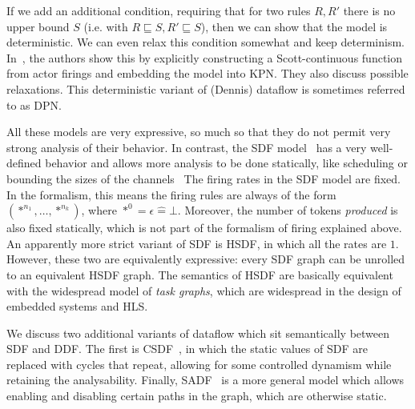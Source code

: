 If we add an additional condition, requiring that for two rules $R,R'$ there is no upper bound $S$ (i.e. with $R \sqsubseteq S, R' \sqsubseteq S$), then we can show that the model is deterministic.
We can even relax this condition somewhat and keep determinism. In~\cite{lee_matsikoudis_semantics}, the authors show this by explicitly constructing a Scott-continuous function from actor firings and embedding the model into \ac{KPN}.
They also discuss possible relaxations.
This deterministic variant of (Dennis) dataflow is sometimes referred to as \ac{DPN}.

All these models are very expressive, so much so that they do not permit very strong analysis of their behavior.
In contrast, the \ac{SDF} model~\cite{lee1987sdf} has a very well-defined behavior and allows more analysis to be done statically, like scheduling or bounding the sizes of the channels~\cite{Parks:M95:105}
The firing rates in the \ac{SDF} model are fixed. In the formalism, this means the firing rules are always of the form $(*^{n_1},\ldots,*^{n_k})$, where $*^0 = \epsilon \mathrel{\widehat{=}} \bot$.
Moreover, the number of tokens \emph{produced} is also fixed statically, which is not part of the formalism of firing explained above. 
An apparently more strict variant of \ac{SDF} is \ac{HSDF}, in which all the rates are $1$. However, these two are equivalently expressive: every \ac{SDF} graph can be unrolled to an equivalent \ac{HSDF} graph.
The semantics of \ac{HSDF} are basically equivalent with the widespread model of \emph{task graphs}, which are widespread in the design of embedded systems and \ac{HLS}.


We discuss two additional variants of dataflow which sit semantically between \ac{SDF} and \ac{DDF}. 
The first is \ac{CSDF}~\cite{bilsen1996cycle}, in which the static values of \ac{SDF} are replaced with cycles that repeat, allowing for some controlled dynamism while retaining the analysability.
Finally, \ac{SADF}~\cite{theelen2006scenario} is a more general model which allows enabling and disabling certain paths in the graph, which are otherwise static.

